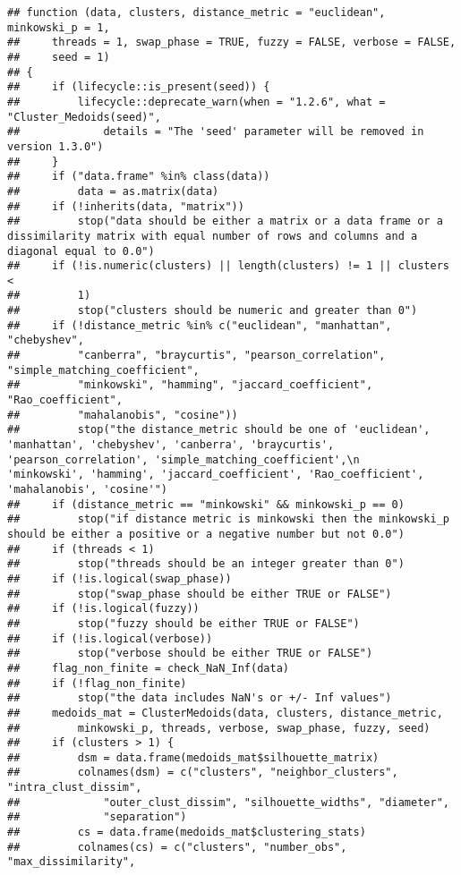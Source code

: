 \documentclass[
]{article}
\begin{document}
\begin{verbatim}
## function (data, clusters, distance_metric = "euclidean", minkowski_p = 1, 
##     threads = 1, swap_phase = TRUE, fuzzy = FALSE, verbose = FALSE, 
##     seed = 1) 
## {
##     if (lifecycle::is_present(seed)) {
##         lifecycle::deprecate_warn(when = "1.2.6", what = "Cluster_Medoids(seed)", 
##             details = "The 'seed' parameter will be removed in version 1.3.0")
##     }
##     if ("data.frame" %in% class(data)) 
##         data = as.matrix(data)
##     if (!inherits(data, "matrix")) 
##         stop("data should be either a matrix or a data frame or a dissimilarity matrix with equal number of rows and columns and a diagonal equal to 0.0")
##     if (!is.numeric(clusters) || length(clusters) != 1 || clusters < 
##         1) 
##         stop("clusters should be numeric and greater than 0")
##     if (!distance_metric %in% c("euclidean", "manhattan", "chebyshev", 
##         "canberra", "braycurtis", "pearson_correlation", "simple_matching_coefficient", 
##         "minkowski", "hamming", "jaccard_coefficient", "Rao_coefficient", 
##         "mahalanobis", "cosine")) 
##         stop("the distance_metric should be one of 'euclidean', 'manhattan', 'chebyshev', 'canberra', 'braycurtis', 'pearson_correlation', 'simple_matching_coefficient',\n         'minkowski', 'hamming', 'jaccard_coefficient', 'Rao_coefficient', 'mahalanobis', 'cosine'")
##     if (distance_metric == "minkowski" && minkowski_p == 0) 
##         stop("if distance metric is minkowski then the minkowski_p should be either a positive or a negative number but not 0.0")
##     if (threads < 1) 
##         stop("threads should be an integer greater than 0")
##     if (!is.logical(swap_phase)) 
##         stop("swap_phase should be either TRUE or FALSE")
##     if (!is.logical(fuzzy)) 
##         stop("fuzzy should be either TRUE or FALSE")
##     if (!is.logical(verbose)) 
##         stop("verbose should be either TRUE or FALSE")
##     flag_non_finite = check_NaN_Inf(data)
##     if (!flag_non_finite) 
##         stop("the data includes NaN's or +/- Inf values")
##     medoids_mat = ClusterMedoids(data, clusters, distance_metric, 
##         minkowski_p, threads, verbose, swap_phase, fuzzy, seed)
##     if (clusters > 1) {
##         dsm = data.frame(medoids_mat$silhouette_matrix)
##         colnames(dsm) = c("clusters", "neighbor_clusters", "intra_clust_dissim", 
##             "outer_clust_dissim", "silhouette_widths", "diameter", 
##             "separation")
##         cs = data.frame(medoids_mat$clustering_stats)
##         colnames(cs) = c("clusters", "number_obs", "max_dissimilarity", 

\end{verbatim}
\end{document}
